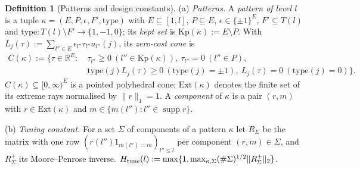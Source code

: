 \documentclass[10pt]{amsart}
\theoremstyle{definition}
\newtheorem{definition}[theorem]{Definition}
\theoremstyle{remark}
\newcommand{\supp}{\operatorname{supp}}
\newcommand{\R}{\mathbb R}
\begin{document}
\begin{definition}[Patterns and design constants]\label{def:II-constants}
\textup{(a)} \emph{Patterns.}  A \emph{pattern of level $l$} is a tuple
$\kappa=(E,P,\epsilon,F',\mathrm{type})$ with $E\subseteq[1,l]$,
$P\subseteq E$, $\epsilon\in\{\pm1\}^E$, $F'\subseteq T(l)$ and
$\mathrm{type}:T(l)\setminus F'\to\{1,-1,0\}$; its \emph{kept set} is
$\mathrm{Kp}(\kappa):=E\setminus P$.  With
$L_j(\tau):=\sum_{l''\in E}\epsilon_{l''}\tau_{l''}u_{l''}(j)$, its
\emph{zero-cost cone} is
\[
 \begin{split}
 C(\kappa):=\{\tau\in\R^E:{}&\ \tau_{l''}\ge0\ (l''\in\mathrm{Kp}(\kappa)),\
 \tau_{l''}=0\ (l''\in P),\\ &\ \mathrm{type}(j)L_j(\tau)\ge0\ (\mathrm{type}(j)
 =\pm1),\ L_j(\tau)=0\ (\mathrm{type}(j)=0)\}.
 \end{split}
\]
$C(\kappa)\subseteq[0,\infty)^E$ is a pointed polyhedral cone; $\mathrm{Ext}
(\kappa)$ denotes the finite set of its extreme rays normalised by
$\|r\|_1=1$.  A \emph{component} of $\kappa$ is a pair $(r,m)$ with
$r\in\mathrm{Ext}(\kappa)$ and $m\in\{m(l''):l''\in\supp r\}$.

\textup{(b)} \emph{Tuning constant.}  For a set $\Sigma$ of components of
a pattern $\kappa$ let $R_\Sigma$ be the matrix with one row
$(r(l'')1_{m(l'')=m})_{l''\le l}$ per component $(r,m)\in\Sigma$, and
$R_\Sigma^+$ its Moore--Penrose inverse.  $H_{\rm tune}(l):=\max\{1,
\max_{\kappa,\Sigma}(\#\Sigma)^{1/2}\|R^+_\Sigma\|_2\}$.


\end{definition}
\end{document}
